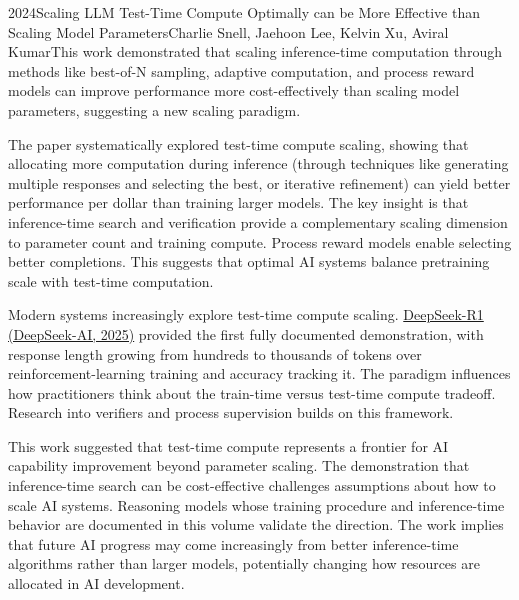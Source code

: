 
\begin{papersummary}{2024}{Scaling LLM Test-Time Compute Optimally can be More Effective than Scaling Model Parameters}{Charlie Snell, Jaehoon Lee, Kelvin Xu, Aviral Kumar}{This work demonstrated that scaling inference-time computation through methods like best-of-N sampling, adaptive computation, and process reward models can improve performance more cost-effectively than scaling model parameters, suggesting a new scaling paradigm.}

The paper systematically explored test-time compute scaling, showing that allocating more computation during inference (through techniques like generating multiple responses and selecting the best, or iterative refinement) can yield better performance per dollar than training larger models. The key insight is that inference-time search and verification provide a complementary scaling dimension to parameter count and training compute. Process reward models enable selecting better completions. This suggests that optimal AI systems balance pretraining scale with test-time computation.

Modern systems increasingly explore test-time compute scaling. \hyperref[paper:deepseek-2025-r1]{DeepSeek-R1 (DeepSeek-AI, 2025)} provided the first fully documented demonstration, with response length growing from hundreds to thousands of tokens over reinforcement-learning training and accuracy tracking it. The paradigm influences how practitioners think about the train-time versus test-time compute tradeoff. Research into verifiers and process supervision builds on this framework.

This work suggested that test-time compute represents a frontier for AI capability improvement beyond parameter scaling. The demonstration that inference-time search can be cost-effective challenges assumptions about how to scale AI systems. Reasoning models whose training procedure and inference-time behavior are documented in this volume validate the direction. The work implies that future AI progress may come increasingly from better inference-time algorithms rather than larger models, potentially changing how resources are allocated in AI development.

\end{papersummary}
